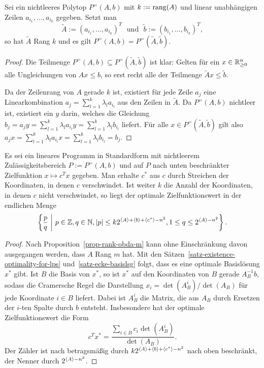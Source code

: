 \begin{proposition}\label{prop-rank-obda-m}
	Sei ein nichtleeres Polytop $P^=(A, b)$ mit $k:=\operatorname{rang}(A)$ und linear unabhängigen Zeilen $a_{i_1},\dots, a_{i_k}$ gegeben.
	Setzt man \[
	\tilde{A}:= (a_{i_1}, \dots, a_{i_k})^T\text{~ und ~}\tilde{b}:= (b_{i_1}, \dots, b_{i_k})^T, \]
	 so hat $\tilde{A}$ Rang $k$ und es gilt $P^=(A,b) = P^=(\tilde{A}, \tilde{b})$.
\end{proposition}
\begin{proof}
	Die Teilmenge $P^=(A,b)\subseteq P^=(\tilde{A}, \tilde{b})$ ist klar:
	Gelten für ein $x\in\mathbb{R}^n_{\geq0}$ alle Ungleichungen von $Ax \leq b$, so erst recht alle der Teilmenge $\tilde{A}x \leq \tilde{b}$.
	
	Da der Zeilenrang von $A$ gerade $k$ ist, existiert für jede Zeile $a_j$ eine Linearkombination $a_j=\sum_{l=1}^k \lambda_l a_{i_l}$ aus den Zeilen in $\tilde{A}$.
	Da $P^=(A,b)$ nichtleer ist, existiert ein $y$ darin, welches die Gleichung
	$b_j = a_j y = \sum_{l=1}^k \lambda_l a_{i_l} y = \sum_{l=1}^k \lambda_l b_{i_l}$ liefert.
	Für alle $x\in P^=(\tilde{A}, \tilde{b})$ gilt also $a_j x = \sum_{l=1}^k \lambda_l a_{i_l} x = \sum_{l=1}^k \lambda_l b_{i_l} = b_j$.
\end{proof}

\begin{lemma}
	Es sei ein lineares Programm in Standardform mit nichtleerem Zu\-lässig\-keits\-bereich $P:= P^=(A,b)$ und auf $P$ nach unten beschränkter Zielfunktion $x\mapsto c^T x$ gegeben.
	Man erhalte $c^*$ aus $c$ durch Streichen der Koordinaten, in denen $c$ verschwindet. Ist weiter $k$ die Anzahl der Koordinaten, in denen $c$ nicht verschwindet, so liegt der optimale Zielfunktionswert in der endlichen Menge
	\[ \left\{ \frac{p}{q} ~\middle|~ p\in\mathbb{Z}, q\in\mathbb{N}, \lvert p\rvert \leq k2^{\langle A\rangle + \langle b\rangle + \langle c^*\rangle - n^2}, 1\leq q \leq 2^{\langle A\rangle-n^2} \right\}. \]
\end{lemma}
\begin{proof}
	Nach Proposition~\ref{prop-rank-obda-m} kann ohne Einschränkung davon ausgegangen werden, dass $A$ Rang $m$ hat.
	Mit den Sätzen~\ref{satz-existence-optimality-for-lps} und~\ref{satz-ecke-basislsg} folgt, dass es eine optimale Basislösung $x^*$ gibt.
	Ist $B$ die Basis von $x^*$, so ist $x^*$ auf den Koordinaten von $B$ gerade $A_B^{-1} b$, sodass die Cramersche Regel die Darstellung $x_i = \det(A_B^i) / \det(A_B)$ für jede Koordinate $i\in B$ liefert.
	Dabei ist $A_B^i$ die Matrix, die aus $A_B$ durch Ersetzen der $i$-ten Spalte durch $b$ entsteht.
	Insbesondere hat der optimale Zielfunktionswert die Form \[
	c^T x^* = 
	\frac{\sum_{i\in B} c_i \det(A_B^i)}{\det(A_B)}.
	\]
	Der Zähler ist nach  betragsmäßig durch $k 2^{\langle A\rangle + \langle b\rangle + \langle c^*\rangle - n^2}$ nach oben beschränkt, der Nenner durch $2^{\langle A\rangle - n^2}$.
\end{proof}


